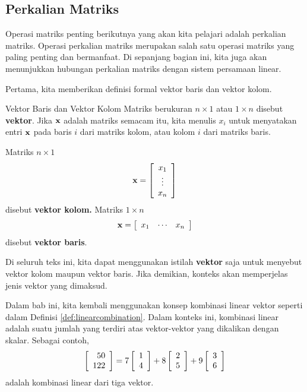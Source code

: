 \subsection{Perkalian Matriks}

Operasi matriks penting berikutnya yang akan kita pelajari adalah perkalian
matriks. Operasi
perkalian matriks merupakan salah satu operasi matriks yang paling penting dan
bermanfaat. Di sepanjang bagian ini, kita juga akan
menunjukkan hubungan perkalian matriks dengan sistem
persamaan linear.

Pertama, kita memberikan definisi formal vektor baris dan vektor kolom. 

\begin{definition}{Vektor Baris dan Vektor Kolom}\label{def:rowandcolumnvectors}
Matriks berukuran $n\times 1$ atau $1\times n$ disebut \textbf{vektor}. Jika $\mathbf{x}$ adalah matriks semacam itu, kita menulis $x_{i}$ untuk
menyatakan entri $\mathbf{x}$ pada baris $i$ dari matriks kolom, atau kolom $i$ dari matriks baris.

Matriks $n\times 1$
\begin{equation*}
\mathbf{x}=\left[
\begin{array}{c}
x_{1} \\
\vdots \\
x_{n}
\end{array}
\right]
\end{equation*}
disebut
 \textbf{vektor kolom.} Matriks $1\times n$
\begin{equation*}
\mathbf{x} = \left[
\begin{array}{ccc}
x_{1} & \cdots & x_{n}
\end{array}
\right]
\end{equation*}
disebut \textbf{vektor baris}.
\end{definition}

Di seluruh teks ini, kita dapat menggunakan istilah \textbf{vektor} saja untuk menyebut vektor kolom maupun vektor baris.
Jika demikian, konteks akan memperjelas jenis vektor yang dimaksud.

Dalam bab ini, kita kembali menggunakan konsep kombinasi linear
vektor seperti dalam Definisi \ref{def:linearcombination}. Dalam konteks ini, kombinasi linear adalah suatu jumlah
yang terdiri atas vektor-vektor yang dikalikan dengan skalar. Sebagai contoh,
\begin{equation*}
\left[
\begin{array}{r}
50 \\
122
\end{array}
\right]
=
7\left[
\begin{array}{r}
1 \\
4
\end{array}
\right] +8\left[
\begin{array}{r}
2 \\
5
\end{array}
\right] +9\left[
\begin{array}{r}
3 \\
6
\end{array}
\right]
\end{equation*}
adalah kombinasi linear dari tiga vektor. 

